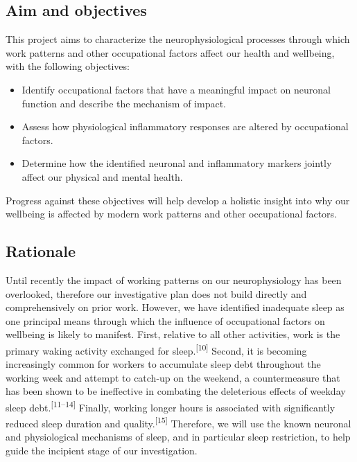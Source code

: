 \documentclass[
  english,
  man, donotrepeattitle]{apa6}
\providecommand{\tightlist}{%
  \setlength{\itemsep}{0pt}\setlength{\parskip}{0pt}}
\begin{document}
\hypertarget{aim-and-objectives}{%
\subsection{Aim and objectives}\label{aim-and-objectives}}

This project aims to characterize the neurophysiological processes through which work patterns and other occupational factors affect our health and wellbeing, with the following objectives:

\begin{itemize}
\tightlist
\item
  Identify occupational factors that have a meaningful impact on neuronal function and describe the mechanism of impact.
\item
  Assess how physiological inflammatory responses are altered by occupational factors.
\item
  Determine how the identified neuronal and inflammatory markers jointly affect our physical and mental health.
\end{itemize}

Progress against these objectives will help develop a holistic insight into why our wellbeing is affected by modern work patterns and other occupational factors.

\newpage

\hypertarget{rationale}{%
\subsection{Rationale}\label{rationale}}

Until recently the impact of working patterns on our neurophysiology has been overlooked, therefore our investigative plan does not build directly and comprehensively on prior work. However, we have identified inadequate sleep as one principal means through which the influence of occupational factors on wellbeing is likely to manifest. First, relative to all other activities, work is the primary waking activity exchanged for sleep.\textsuperscript{{[}10{]}} Second, it is becoming increasingly common for workers to accumulate sleep debt throughout the working week and attempt to catch-up on the weekend, a countermeasure that has been shown to be ineffective in combating the deleterious effects of weekday sleep debt.\textsuperscript{{[}11--14{]}} Finally, working longer hours is associated with significantly reduced sleep duration and quality.\textsuperscript{{[}15{]}} Therefore, we will use the known neuronal and physiological mechanisms of sleep, and in particular sleep restriction, to help guide the incipient stage of our investigation.
\end{document}
